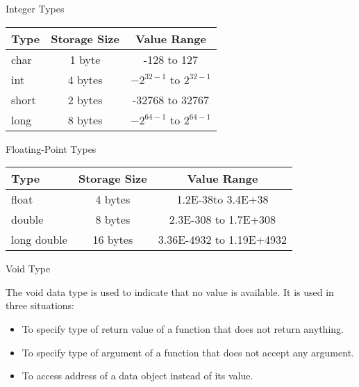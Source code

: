 \documentclass[compress]{beamer}
\begin{document}
\begin{slide}
	\begin{block}{Integer Types}

	\begin{table}
	\begin{tabular}{lcc}
	\toprule
	Type & Storage Size & Value Range \\
	\midrule
	char & 1 byte & -128 to 127 \\
	int & 4 bytes & $-2^{32-1}$ to $2^{32-1}$ \\
	short & 2 bytes & -32768 to 32767 \\
	long & 8 bytes & $-2^{64-1}$ to $2^{64-1}$ \\
	\bottomrule
	\end{tabular}
	\end{table}

	\end{block}
\end{slide}

\begin{slide}
	\begin{block}{Floating-Point Types}

	\begin{table}
	\begin{tabular}{lcc}
	\toprule
	Type & Storage Size & Value Range \\
	\midrule
	float & 4 bytes & 1.2E-38to 3.4E+38 \\
	double & 8 bytes & 2.3E-308 to 1.7E+308 \\
	long double & 16 bytes & 3.36E-4932 to 1.19E+4932 \\
	\bottomrule
	\end{tabular}
	\end{table}

	\end{block}
\end{slide}

\begin{slide}
	\begin{block}{Void Type}

	The \alert{void} data type is used to indicate that no value is available.
	It is used in three situations:

	\begin{itemize}
	\item[] To specify type of return value of a function that does not return anything.
	\item[] To specify type of argument of a function that does not accept any argument.
	\item[] To access address of a data object instead of its value.
	\end{itemize}

	\end{block}
\end{slide}
\end{document}
